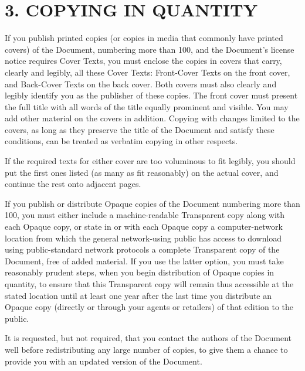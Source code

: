 \section{3. COPYING IN QUANTITY}
If you publish printed copies (or copies in media that commonly have printed covers) of the Document, numbering more than 100, and the Document's license notice requires Cover Texts, you must enclose the copies in covers that carry, clearly and legibly, all these Cover Texts: Front-Cover Texts on the front cover, and Back-Cover Texts on the back cover. Both covers must also clearly and legibly identify you as the publisher of these copies. The front cover must present the full title with all words of the title equally prominent and visible. You may add other material on the covers in addition. Copying with changes limited to the covers, as long as they preserve the title of the Document and satisfy these conditions, can be treated as verbatim copying in other respects.\par
If the required texts for either cover are too voluminous to fit legibly, you should put the first ones listed (as many as fit reasonably) on the actual cover, and continue the rest onto adjacent pages.\par
If you publish or distribute Opaque copies of the Document numbering more than 100, you must either include a machine-readable Transparent copy along with each Opaque copy, or state in or with each Opaque copy a computer-network location from which the general network-using public has access to download using public-standard network protocols a complete Transparent copy of the Document, free of added material. If you use the latter option, you must take reasonably prudent steps, when you begin distribution of Opaque copies in quantity, to ensure that this Transparent copy will remain thus accessible at the stated location until at least one year after the last time you distribute an Opaque copy (directly or through your agents or retailers) of that edition to the public.\par
It is requested, but not required, that you contact the authors of the Document well before redistributing any large number of copies, to give them a chance to provide you with an updated version of the Document.
